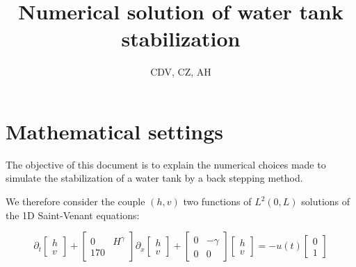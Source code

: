 \documentclass[a4paper]{article}
\title{Numerical solution of water tank stabilization}
\author{CDV, CZ, AH}
\begin{document}
\maketitle


\section{Mathematical settings}

The objective of this document is to explain the numerical choices made 
to simulate the stabilization of a water tank by a back stepping method.

We therefore consider the couple $(h,v)$ two functions of $L^2(0,L)$
solutions of the 1D Saint-Venant equations:

\[
\partial_t 
\begin{bmatrix}
	h \\
	v
\end{bmatrix} 
+  
\begin{bmatrix}
	0 & H^\gamma \\
	1 7 0
\end{bmatrix} 
\partial_x
\begin{bmatrix}
	h \\
	v
\end{bmatrix} 
+
\begin{bmatrix}
	0 & -\gamma \\
	0 & 0
\end{bmatrix} 
\begin{bmatrix}
	h \\
	v
\end{bmatrix} 
=
-u(t)
 \begin{bmatrix}
	0 \\
	1
\end{bmatrix} 
\]
\end{document}
